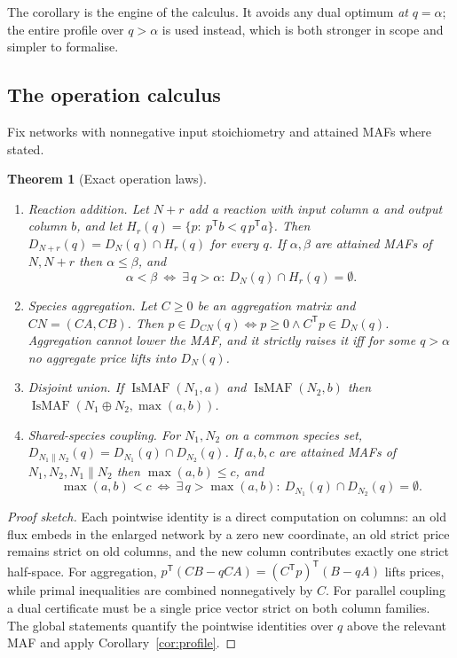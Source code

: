 \documentclass[11pt,a4paper]{article}
\theoremstyle{plain}
\newtheorem{theorem}{Theorem}[section]
\theoremstyle{definition}
\theoremstyle{remark}
\newcommand{\Tp}{^{\mathsf T}}
\begin{document}
The corollary is the engine of the calculus. It avoids any dual optimum \emph{at} $q=\alpha$; the entire profile over $q>\alpha$ is used instead, which is both stronger in scope and simpler to formalise.

\subsection{The operation calculus}

Fix networks with nonnegative input stoichiometry and attained MAFs where stated.

\begin{theorem}[Exact operation laws]\label{thm:ops}
\begin{enumerate}[label=(\roman*)]
\item \emph{Reaction addition.} Let $N+r$ add a reaction with input column $a$ and output column $b$, and let $H_r(q)=\{p:\ p\Tp b<q\,p\Tp a\}$. Then $D_{N+r}(q)=D_N(q)\cap H_r(q)$ for every $q$. If $\alpha,\beta$ are attained MAFs of $N,N+r$ then $\alpha\le\beta$, and
\[
\alpha<\beta\ \iff\ \exists\,q>\alpha:\ D_N(q)\cap H_r(q)=\emptyset .
\]
\item \emph{Species aggregation.} Let $C\ge 0$ be an aggregation matrix and $CN=(CA,CB)$. Then $p\in D_{CN}(q)\iff p\ge 0\wedge C\Tp p\in D_N(q)$. Aggregation cannot lower the MAF, and it strictly raises it iff for some $q>\alpha$ no aggregate price lifts into $D_N(q)$.
\item \emph{Disjoint union.} If $\operatorname{IsMAF}(N_1,a)$ and $\operatorname{IsMAF}(N_2,b)$ then $\operatorname{IsMAF}(N_1\oplus N_2,\max(a,b))$.
\item \emph{Shared-species coupling.} For $N_1,N_2$ on a common species set, $D_{N_1\parallel N_2}(q)=D_{N_1}(q)\cap D_{N_2}(q)$. If $a,b,c$ are attained MAFs of $N_1,N_2,N_1\parallel N_2$ then $\max(a,b)\le c$, and
\[
\max(a,b)<c\ \iff\ \exists\,q>\max(a,b):\ D_{N_1}(q)\cap D_{N_2}(q)=\emptyset .
\]
\end{enumerate}
\end{theorem}

\begin{proof}[Proof sketch]
Each pointwise identity is a direct computation on columns: an old flux embeds in the enlarged network by a zero new coordinate, an old strict price remains strict on old columns, and the new column contributes exactly one strict half-space. For aggregation, $p\Tp(CB-qCA)=(C\Tp p)\Tp(B-qA)$ lifts prices, while primal inequalities are combined nonnegatively by $C$. For parallel coupling a dual certificate must be a single price vector strict on both column families. The global statements quantify the pointwise identities over $q$ above the relevant MAF and apply Corollary~\ref{cor:profile}.
\end{proof}
\end{document}
